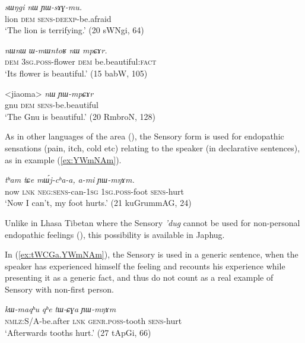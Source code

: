 \documentclass[oldfontcommands,oneside,a4paper,11pt]{article}
\newcommand{\ipa}[1]{{\phon\textit{#1}}} %
\newcommand{\refb}[1]{(\ref{#1})}
\newcommand{\factual}[1]{\textsc{:fact}}
\begin{document}
\begin{exe}
\ex \label{ex:YWsAGmu}
\gll 
\ipa{sɯŋgi}  	\ipa{nɯ}  	\ipa{ɲɯ-sɤɣ-mu.}  \\
lion \textsc{dem} \textsc{sens-deexp}-be.afraid \\
\glt `The lion is terrifying.' (20 sWNgi, 64)
\end{exe}


\begin{exe}
\ex \label{ex:mpCAr}
\gll
\ipa{nɯnɯ}  	\ipa{ɯ-mɯntoʁ}  	\ipa{nɯ}  	\ipa{mpɕɤr.}  \\
\textsc{dem} \textsc{3sg.poss}-flower \textsc{dem} be.beautiful\factual{} \\
\glt `Its flower is beautiful.' (15 babW, 105)
\end{exe}


\begin{exe}
\ex \label{ex:YWmpCAr}
\gll 
<jiaoma> 	\ipa{nɯ}  	\ipa{ɲɯ-mpɕɤr}  \\
gnu \textsc{dem} \textsc{sens}-be.beautiful \\
\glt `The Gnu is beautiful.' (20 RmbroN, 128)
\end{exe}

As in other languages of the area (\citealt{tournadre14evidentiality}), the Sensory form is used for endopathic sensations (pain, itch, cold etc)  relating to the speaker (in declarative sentences), as in example \refb{ex:YWmNAm}.

\begin{exe}
\ex \label{ex:YWmNAm}
\gll
\ipa{tʰam} 	\ipa{tɕe} 	\ipa{mɯ́j-cʰa-a,} 	\ipa{a-mi} 	\ipa{ɲɯ-mŋɤm.} \\
now \textsc{lnk} \textsc{neg:sens}-can-\textsc{1sg} \textsc{1sg.poss}-foot \textsc{sens}-hurt \\
\glt `Now I can't, my foot hurts.' (21 kuGrummAG, 24)
\end{exe}


Unlike in Lhasa Tibetan where the Sensory \ipa{'dug} cannot be used for non-personal endopathic feelings (\citealt{tournadre14evidentiality}), this possibility is available in Japhug. 

In \refb{ex:tWCGa.YWmNAm}, the Sensory is used in a generic sentence, when the speaker has experienced himself the feeling and recounts his experience while presenting it as a generic fact, and thus do not count as a real example of Sensory with non-first person.

\begin{exe}
\ex \label{ex:tWCGa.YWmNAm}
\gll
\ipa{kɯ-maqʰu}  	\ipa{qʰe}  	\ipa{tɯ-ɕɣa}  	\ipa{ɲɯ-mŋɤm}  \\
\textsc{nmlz}:S/A-be.after \textsc{lnk} \textsc{genr.poss}-tooth \textsc{sens}-hurt \\
\glt `Afterwards tooths hurt.' (27 tApGi, 66)
\end{exe}
\end{document}
